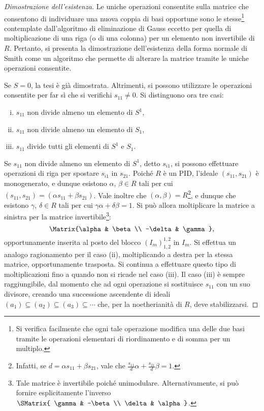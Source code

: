 \documentclass[12pt]{scrartcl}
\begin{document}
	\begin{proof}[Dimostrazione dell'esistenza]
		Le uniche operazioni consentite sulla matrice che consentono di
		individuare una nuova coppia di basi opportune sono le stesse\footnote{
			Si verifica facilmente che ogni tale operazione modifica una delle
			due basi tramite le operazioni elementari di riordinamento e di somma
			per un multiplo.
		}
		contemplate dall'algoritmo di eliminazione di Gauss eccetto per quella
		di moltiplicazione di una riga (o di una colonna) per un elemento non invertibile
		di $R$. Pertanto, si presenta la dimostrazione dell'esistenza della
		forma normale di Smith come un algoritmo che permette di alterare la
		matrice tramite le uniche operazioni consentite. \medskip
		
		
		Se $S=0$, la tesi è già dimostrata. Altrimenti, si possono utilizzare le
		operazioni consentite per far sì che si verifichi $s_{11} \neq 0$. Si
		distinguono ora tre casi:
		\begin{enumerate}[(i)]
			\item $s_{11}$ non divide almeno un elemento di $S^1$,
			\item $s_{11}$ non divide almeno un elemento di $S_1$,
			\item $s_{11}$ divide tutti gli elementi di $S^1$ e $S_1$.
		\end{enumerate}
		
		Se $s_{11}$ non divide almeno un elemento di $S^1$, detto $s_{i1}$,
		si possono effettuare operazioni di riga per spostare $s_{i1}$
		in $s_{21}$. Poiché $R$ è un PID, l'ideale $(s_{11}, s_{21})$ è monogenerato,
		e dunque esistono $\alpha$, $\beta \in R$ tali per cui
		$(s_{11}, s_{21}) = (\alpha s_{11} + \beta s_{21})$. Vale inoltre
		che $(\alpha, \beta) = R$\footnote{
			Infatti, se $d = \alpha s_{11} + \beta s_{21}$, vale che
			$\frac{s_{11}}{d} \alpha + \frac{s_{21}}{d} \beta = 1$.
		}, e dunque che esistono $\gamma$, $\delta \in R$
		tali per cui $\gamma \alpha + \delta \beta = 1$. Si può
		allora moltiplicare la matrice a sinistra per la matrice
		invertibile\footnote{
			Tale matrice è invertibile poiché unimodulare. Alternativamente, si
			può fornire esplicitamente l'inverso $\SMatrix{ \gamma & -\beta \\ \delta & \alpha }$.
		}:
		\[ \Matrix{\alpha & \beta \\ -\delta & \gamma }, \]
		opportunamente inserita al posto del blocco $(I_m)^{1,2}_{1,2}$ in $I_m$.
		Si effettua un analogo ragionamento per il caso (ii), moltiplicando a destra
		per la stessa matrice, opportunamente trasposta. Si continua a effettuare questo
		tipo di moltiplicazioni fino a quando non si ricade nel caso (iii). Il caso
		(iii) è sempre raggiungibile, dal momento che ad ogni operazione si sostituisce
		$s_{11}$ con un suo divisore, creando una successione ascendente di ideali
		$(a_1) \subseteq (a_2) \subseteq (a_3) \subseteq \cdots$ che, per la noetherianità
		di $R$, deve stabilizzarsi. \medskip
		

\end{proof}
\end{document}
